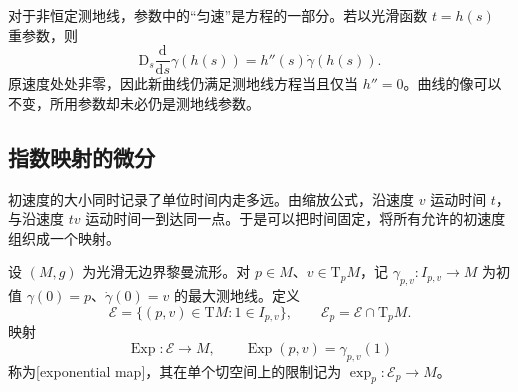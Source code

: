 对于非恒定测地线，参数中的“匀速”是方程的一部分。若以光滑函数 \(t=h(s)\) 重参数，则
\[
	\mathrm{D}_s\frac{\mathrm{d}}{\mathrm{d}s}\gamma(h(s))
	=h''(s)\dot\gamma(h(s)).
\]
原速度处处非零，因此新曲线仍满足测地线方程当且仅当 \(h''=0\)。曲线的像可以不变，所用参数却未必仍是测地线参数。

\subsection{指数映射的微分}
\label{g3:subsec:0201:02}

初速度的大小同时记录了单位时间内走多远。由缩放公式，沿速度 \(v\) 运动时间 \(t\)，与沿速度 \(tv\) 运动时间一到达同一点。于是可以把时间固定，将所有允许的初速度组织成一个映射。

\begin{definition}\label{g3:def:exponential-map}
	设 \((M,g)\) 为光滑无边界黎曼流形。对 \(p\in M\)、\(v\in\mathrm T_pM\)，记 \(\gamma_{p,v}:I_{p,v}\to M\) 为初值 \(\gamma(0)=p\)、\(\dot\gamma(0)=v\) 的最大测地线。定义
	\[
		\mathcal E=\{(p,v)\in\mathrm{T}M:1\in I_{p,v}\},
		\qquad
		\mathcal E_p=\mathcal E\cap\mathrm{T}_pM.
	\]
	映射
	\[
		\operatorname{Exp}:\mathcal E\longrightarrow M,\qquad
		\operatorname{Exp}(p,v)=\gamma_{p,v}(1)
	\]
	称为[exponential map]，其在单个切空间上的限制记为 \(\exp_p:\mathcal E_p\to M\)。
\end{definition}

